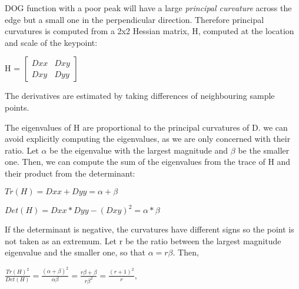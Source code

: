 \documentclass[12pt,a4paper]{report}
\begin{document}
\begin{flushleft}
 DOG function with a  poor peak  will have a large \textit{principal curvature} across the edge but a small one in the perpendicular direction. Therefore  principal curvatures is  computed from a 2x2 Hessian matrix, H, computed at the location and scale of the keypoint:\par

\vspace{10mm}


\quad
\begin{center}H = $\begin{bmatrix} Dxx  & Dxy  \\ Dxy & Dyy \end{bmatrix}$\end{center}
\vspace{10mm}

The derivatives are estimated by taking differences of neighbouring sample points.

\vspace{5mm}
The eigenvalues of H are proportional to the principal curvatures of D. we can avoid explicitly computing the eigenvalues, as we are only concerned with their ratio. Let $\alpha$ be the eigenvalue with the largest magnitude and  $\beta$ be the smaller one. Then, we can compute the sum of the eigenvalues from the trace of H and their product from the determinant:
\vspace{10mm}


\begin{center}$
		Tr(H) = Dxx + Dyy = \alpha + \beta$\end{center}
		
		\vspace{1mm}
\begin{center}$		 Det(H) = Dxx*Dyy- (Dxy)^2 = \alpha*\beta$\end{center}

\vspace{10mm}

If the determinant is negative, the curvatures have different signs so the point is not  taken as an extremum. Let r be the ratio between the largest magnitude eigenvalue and the smaller one, so that $\alpha = r\beta$. Then,
		
\vspace{10mm}

\begin{center}$ \frac{Tr(H)^2}{Det(H)} = \frac{(\alpha + \beta)^2}{\alpha\beta} = \frac{r\beta + \beta}{r\beta^2} = \frac{(r+1)^2}{r},$\end{center}


\end{flushleft}
\end{document}

